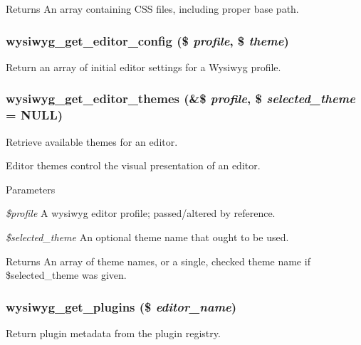 \begin{DoxyReturn}{Returns}
An array containing CSS files, including proper base path. 
\end{DoxyReturn}
\hypertarget{wysiwyg_8module_ab78fc846dcedb3edb5adb2b45484b035}{
\subsubsection[{wysiwyg\_\-get\_\-editor\_\-config}]{\setlength{\rightskip}{0pt plus 5cm}wysiwyg\_\-get\_\-editor\_\-config (\$ {\em profile}, \/  \$ {\em theme})}}
\label{wysiwyg_8module_ab78fc846dcedb3edb5adb2b45484b035}
Return an array of initial editor settings for a Wysiwyg profile. \hypertarget{wysiwyg_8module_a1fe97b670fb3c1acd100c22af70b7a36}{
\subsubsection[{wysiwyg\_\-get\_\-editor\_\-themes}]{\setlength{\rightskip}{0pt plus 5cm}wysiwyg\_\-get\_\-editor\_\-themes (\&\$ {\em profile}, \/  \$ {\em selected\_\-theme} = {\ttfamily NULL})}}
\label{wysiwyg_8module_a1fe97b670fb3c1acd100c22af70b7a36}
Retrieve available themes for an editor.

Editor themes control the visual presentation of an editor.


\begin{DoxyParams}{Parameters}
\item[{\em \$profile}]A wysiwyg editor profile; passed/altered by reference. \item[{\em \$selected\_\-theme}]An optional theme name that ought to be used.\end{DoxyParams}
\begin{DoxyReturn}{Returns}
An array of theme names, or a single, checked theme name if \$selected\_\-theme was given. 
\end{DoxyReturn}
\hypertarget{wysiwyg_8module_aa1a3edbe06c8528dd901cd199ec50918}{
\subsubsection[{wysiwyg\_\-get\_\-plugins}]{\setlength{\rightskip}{0pt plus 5cm}wysiwyg\_\-get\_\-plugins (\$ {\em editor\_\-name})}}
\label{wysiwyg_8module_aa1a3edbe06c8528dd901cd199ec50918}
Return plugin metadata from the plugin registry.


